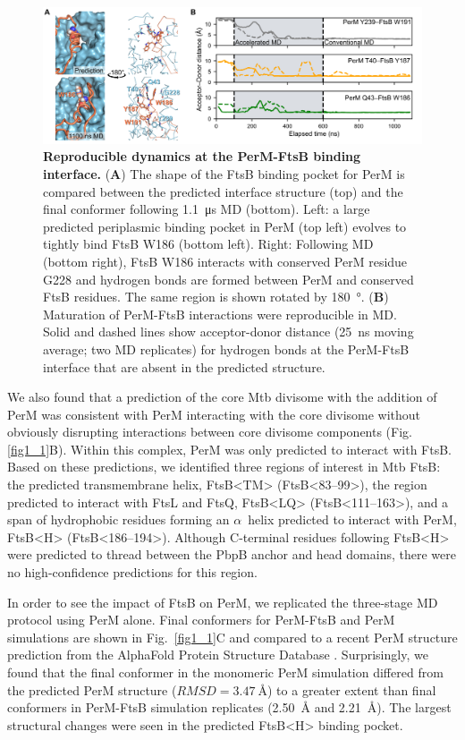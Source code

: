 \documentclass[twocolumn,pdflatex,sn-nature]{sn-jnl}%
\def\textsuperscript#1{<#1>}%
\newcommand\mtb{Mtb}
\newcommand\ftsbTM{FtsB\textsuperscript{TM}}
\newcommand\ftsbLQ{FtsB\textsuperscript{LQ}}
\newcommand\ftsbH{FtsB\textsuperscript{H}}
\begin{document}
\begin{figure}[t]
    \centering
    \includegraphics[width=1.0\textwidth]{../figures/fig1_2.png}
    \caption{
        \textbf{Reproducible dynamics at the PerM-FtsB binding interface.}
        (\textbf{A}) The shape of the FtsB binding pocket for PerM is compared between the predicted interface structure (top) and the final conformer following \qty{1.1}{\us} MD (bottom). Left: a large predicted periplasmic binding pocket in PerM (top left) evolves to tightly bind FtsB W186 (bottom left). Right: Following MD (bottom right), FtsB W186 interacts with conserved PerM residue G228 and hydrogen bonds are formed between PerM and conserved FtsB residues. The same region is shown rotated by \qty{180}{\degree}.
        (\textbf{B}) Maturation of PerM-FtsB interactions were reproducible in MD. Solid and dashed lines show acceptor-donor distance (\qty{25}{\ns} moving average; two MD replicates) for hydrogen bonds at the PerM-FtsB interface that are absent in the predicted structure.
    }\label{fig1_2}
\end{figure}

We also found that a prediction of the core \mtb{} divisome with the addition of PerM was consistent with PerM interacting with the core divisome without obviously disrupting interactions between core divisome components (Fig. \ref{fig1_1}B).
Within this complex, PerM was only predicted to interact with FtsB.
Based on these predictions, we identified three regions of interest in \mtb{} FtsB: the predicted transmembrane helix, \ftsbTM{} (FtsB\textsuperscript{83--99}), the region predicted to interact with FtsL and FtsQ, \ftsbLQ{} (FtsB\textsuperscript{111--163}), and a span of hydrophobic residues forming an $\alpha$~helix predicted to interact with PerM, \ftsbH{} (FtsB\textsuperscript{186--194}).
Although C-terminal residues following \ftsbH{} were predicted to thread between the PbpB anchor and head domains, there were no high-confidence predictions for this region.

In order to see the impact of FtsB on PerM, we replicated the three-stage MD protocol using PerM alone.
Final conformers for PerM-FtsB and PerM simulations are shown in Fig.~\ref{fig1_1}C and compared to a recent PerM structure prediction from the AlphaFold Protein Structure Database \citep{varadiAlphaFoldProteinStructure2022}.
Surprisingly, we found that the final conformer in the monomeric PerM simulation differed from the predicted PerM structure ($RMSD=\qty{3.47}{\angstrom}$) to a greater extent than final conformers in PerM-FtsB simulation replicates (\qty{2.50}{\angstrom} and \qty{2.21}{\angstrom}).
The largest structural changes were seen in the predicted \ftsbH{} binding pocket.
\end{document}

